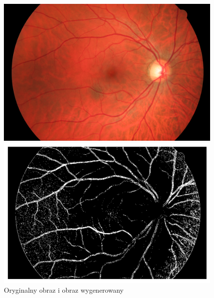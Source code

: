 \documentclass{article}
\begin{document}
\begin{enumerate}
\begin{enumerate}
\begin{enumerate}
                    \end{enumerate}

                    \begin{figure}[h]
                        \centering
                        \begin{minipage}{0.4\textwidth}
                            \centering
                            \includegraphics[width=\linewidth]{../train-images/01_h.jpg}
                        \end{minipage}
                        \begin{minipage}{0.4\textwidth}
                            \centering
                            \includegraphics[width=\linewidth]{../res/sample-generated-image-random-forest.png}
                        \end{minipage}
                        \caption{Oryginalny obraz i obraz wygenerowany}
                    \end{figure}


\end{enumerate}
\end{enumerate}
\end{document}
